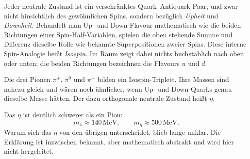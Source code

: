 Jeder neutrale Zustand ist ein verschränktes Quark--Antiquark-Paar, und zwar nicht hinsichtlich des gewöhnlichen Spins, sondern bezüglich \emph{Upheit} und \emph{Downheit}. Behandelt man Up- und Down-Flavour mathematisch wie die beiden Richtungen einer Spin-Half-Variablen, spielen die oben stehende Summe und Differenz dieselbe Rolle wie bekannte Superpositionen zweier Spins. Diese interne Spin-Analogie heißt \emph{Isospin}. Im Raum zeigt dabei nichts buchstäblich nach oben oder unten; die beiden Richtungen bezeichnen die Flavours \(u\) und \(d\).

Die drei Pionen \(\pi^+\), \(\pi^0\) und \(\pi^-\) bilden ein Isospin-Triplett. Ihre Massen sind nahezu gleich und wären noch ähnlicher, wenn Up- und Down-Quarks genau dieselbe Masse hätten. Der dazu orthogonale neutrale Zustand heißt \(\eta\).

Das \(\eta\) ist deutlich schwerer als ein Pion:
\begin{equation}
m_\pi \approx 140\,\mathrm{MeV},
\qquad
m_\eta \approx 500\,\mathrm{MeV}.
\end{equation}
Warum sich das \(\eta\) von den übrigen unterscheidet, blieb lange unklar. Die Erklärung ist inzwischen bekannt, aber mathematisch abstrakt und wird hier nicht hergeleitet.

\begin{classroomqa}
\end{classroomqa}

\begin{classroomqa}
\end{classroomqa}

\begin{classroomqa}
\end{classroomqa}

